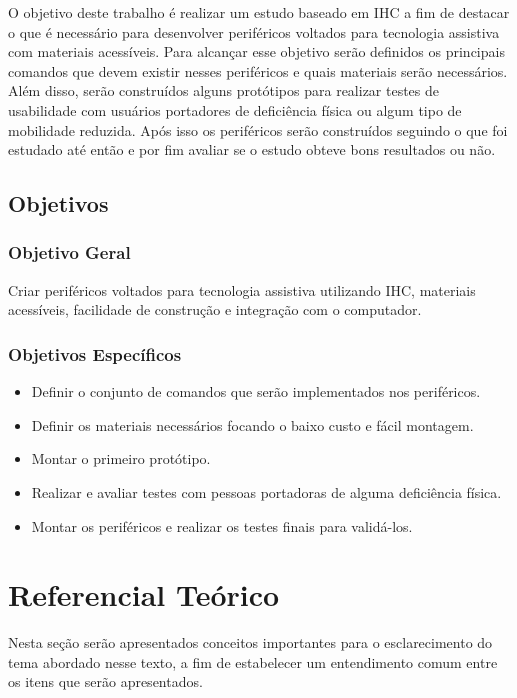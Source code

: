 \documentclass[
	12pt,			%
	openright,		%
	oneside,			%
	a4paper,			%
	chapter=TITLE,		%
	english,			%
	brazil,			%
	]{abntex2}
\begin{document}
O objetivo deste trabalho é realizar um estudo baseado em IHC a fim de destacar o que é necessário para desenvolver periféricos voltados para tecnologia assistiva com materiais acessíveis. Para alcançar esse objetivo serão definidos os principais comandos que devem existir nesses periféricos e quais materiais serão necessários. Além disso, serão construídos alguns protótipos para realizar testes de usabilidade com usuários portadores de deficiência física ou algum tipo de mobilidade reduzida. Após isso os periféricos serão construídos seguindo o que foi estudado até então e por fim avaliar se o estudo obteve bons resultados ou não.

\section{Objetivos}
\label{obj}

\subsection{Objetivo Geral}
Criar periféricos voltados para tecnologia assistiva utilizando IHC, materiais acessíveis, facilidade de construção e integração com o computador.

\subsection{Objetivos Específicos}
\begin{itemize}
	\item Definir o conjunto de comandos que serão implementados nos periféricos.
	\item Definir os materiais necessários focando o baixo custo e fácil montagem.
	\item Montar o primeiro protótipo.
	\item Realizar e avaliar testes com pessoas portadoras de alguma deficiência física.
	\item Montar os periféricos e realizar os testes finais para validá-los.
\end{itemize}


\chapter{Referencial Teórico}
\label{refteo}

Nesta seção serão apresentados conceitos importantes para o esclarecimento do tema abordado nesse texto, a fim de estabelecer um entendimento comum entre os itens que serão apresentados.
\end{document}
